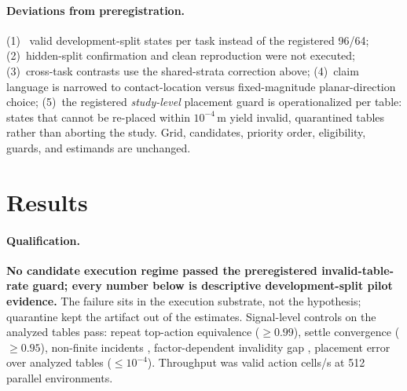 \documentclass{article}
\begin{document}
\paragraph{Deviations from preregistration.}
(1)~\nstatespertask{} valid development-split states per task instead of
the registered 96/64; (2)~hidden-split confirmation and clean reproduction
were not executed; (3)~cross-task contrasts use the shared-strata
correction above; (4)~claim language is narrowed to contact-location versus
fixed-magnitude planar-direction choice; (5)~the registered
\emph{study-level} placement guard is operationalized per table: states
that cannot be re-placed within $10^{-4}$\,m yield invalid, quarantined
tables rather than aborting the study. Grid, candidates, priority order,
eligibility, guards, and estimands are unchanged.

\section{Results}
\label{sec:results}
\paragraph{Qualification.}
\textbf{No candidate execution regime passed the preregistered
invalid-table-rate guard; every number below is descriptive
development-split pilot evidence.} \guardlead{} The failure sits in the
execution substrate, not the hypothesis; quarantine kept the artifact out
of the estimates. Signal-level controls on the
analyzed tables pass: repeat
top-action equivalence \guardrepagree{} ($\ge 0.99$), settle convergence
\guardsettle{} ($\ge 0.95$), non-finite incidents \guardnonfinite{},
factor-dependent invalidity gap \guardfactorgap{}, placement error over
analyzed tables \guardplaceerrused{} ($\le 10^{-4}$). Throughput was
\cellsps{} valid action cells/s at 512 parallel environments.

\begin{table}[t]
\centering\small
\caption{Primary contrast $\Delta_{WH}=\mathbb{E}_s[v_P-v_U]$ per task
(candidate \selcand{}); studentized max-$t$ simultaneous 95\% CIs over the
three-task family; $n$ = valid states. Labels apply the preregistered rule
(minimum effect $0.02$) \emph{descriptively}; development split only.}
\label{tab:primary}
\resizebox{\columnwidth}{!}{\primarytable}
\end{table}

\begin{table}[t]
\centering\small
\caption{Factorial decomposition per task (candidate \selcand{}; state
means, pointwise 95\% bootstrap CIs). $I$ is upward-biased by noise;
compare with the zero-displacement floor (median \zerodeltamed, p99
\zerodeltapninenine).}
\label{tab:decomp}
\resizebox{\columnwidth}{!}{\decomptable}
\end{table}
\end{document}
